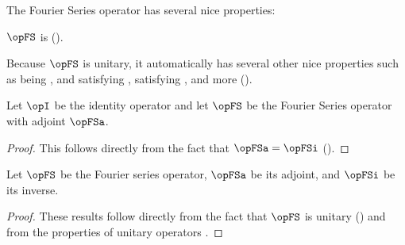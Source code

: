 The Fourier Series operator has several nice properties: 
\begin{liste}
  \item $\opFS$ is  
    ().
  \item Because $\opFS$ is unitary, it automatically has several other nice 
        properties such as being , and satisfying 
        , satisfying , and more
        ().
\end{liste}

\begin{corollary}
\label{cor:fs_unitary}
  
Let $\opI$ be the identity operator
and let $\opFS$ be the Fourier Series operator with
adjoint $\opFSa$.
\end{corollary}
\begin{proof}
This follows directly from the fact that $\opFSa=\opFSi$ ().
\end{proof}

\begin{corollary}
\label{cor:fs_prop}
  
Let $\opFS$ be the Fourier series operator,
    $\opFSa$ be its adjoint,
and $\opFSi$ be its inverse.
\end{corollary}
\begin{proof}
These results follow directly from the fact that $\opFS$
is unitary () and from
the properties of unitary operators%
.
\end{proof}

